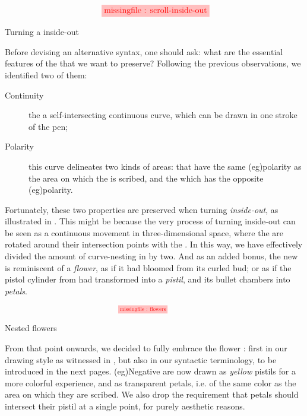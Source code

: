\begin{scope}
\begin{marginfigure}
  $$
  \tikzfig{1}{0.4}{scroll-inside-out}
  $$
  \caption{Turning a  inside-out}
\end{marginfigure}

Before devising an alternative syntax, one should ask: what are the essential
features of the  that we want to preserve? Following
the previous observations, we identified two of them:
\begin{description}
  \item[Continuity] the  a self-intersecting
  continuous curve, which can be drawn in one stroke of the pen;
  \item[Polarity] this curve delineates two kinds of areas:  that have
  the same \kl(eg){polarity} as the area on which the  is scribed, and the  which has the opposite
  \kl(eg){polarity}.
\end{description}

Fortunately, these two properties are preserved when turning 
\emph{inside-out}, as illustrated in . This might be
because the very process of turning inside-out can be seen as a continuous
movement in three-dimensional space, where the  are rotated around their
intersection points with the . In this way, we have effectively divided
the amount of curve-nesting in  by two. And as an
added bonus, the new  is reminiscent of a \emph{flower}, as if it had
bloomed from its curled bud; or as if the pistol cylinder from
 had transformed into a \emph{pistil}, and its bullet
chambers into \emph{petals}.

\begin{marginfigure}
  $$
  \hspace{-3em}
  \stkfig{0.65}{flowers}
  $$
  \vspace{-3em}
  \caption{Nested flowers}
\end{marginfigure}

From that point onwards, we decided to fully embrace the flower :
first in our drawing style as witnessed in , but also in our
syntactic terminology, to be introduced in the next pages. \kl(eg){Negative}
 are now drawn as \emph{yellow} pistils for a more colorful experience,
and  as transparent petals, i.e. of the same color as the area on which
they are scribed. We also drop the requirement that petals should intersect
their pistil at a single point, for purely aesthetic reasons.


\end{scope}
